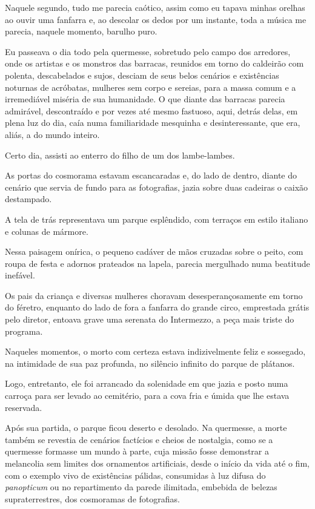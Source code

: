 Naquele segundo, tudo me parecia caótico, assim como eu tapava minhas orelhas ao ouvir uma fanfarra e, ao descolar os dedos por um instante, toda a música me parecia, naquele momento, barulho puro.

Eu passeava o dia todo pela quermesse, sobretudo pelo campo dos arredores, onde os artistas e os monstros das barracas, reunidos em torno do caldeirão com polenta, descabelados e sujos, desciam de seus belos cenários e existências noturnas de acróbatas, mulheres sem corpo e sereias, para a massa comum e a irremediável miséria de sua humanidade. O que diante das barracas parecia admirável, descontraído e por vezes até mesmo fastuoso, aqui, detrás delas, em plena luz do dia, caía numa familiaridade mesquinha e desinteressante, que era, aliás, a do mundo inteiro.

Certo dia, assisti ao enterro do filho de um dos lambe-lambes.

As portas do cosmorama estavam escancaradas e, do lado de dentro, diante do cenário que servia de fundo para as fotografias, jazia sobre duas cadeiras o caixão destampado.

A tela de trás representava um parque esplêndido, com terraços em estilo italiano e colunas de mármore.

Nessa paisagem onírica, o pequeno cadáver de mãos cruzadas sobre o peito, com roupa de festa e adornos prateados na lapela, parecia mergulhado numa beatitude inefável.

Os pais da criança e diversas mulheres choravam desesperançosamente em torno do féretro, enquanto do lado de fora a fanfarra do grande circo, emprestada grátis pelo diretor, entoava grave uma serenata do Intermezzo, a peça mais triste do programa.

Naqueles momentos, o morto com certeza estava indizivelmente feliz e sossegado, na intimidade de sua paz profunda, no silêncio infinito do parque de plátanos.

Logo, entretanto, ele foi arrancado da solenidade em que jazia e posto numa carroça para ser levado ao cemitério, para a cova fria e úmida que lhe estava reservada.

Após sua partida, o parque ficou deserto e desolado. Na quermesse, a morte também se revestia de cenários factícios e cheios de nostalgia, como se a quermesse formasse um mundo à parte, cuja missão fosse demonstrar a melancolia sem limites dos ornamentos artificiais, desde o início da vida até o fim, com o exemplo vivo de existências pálidas, consumidas à luz difusa do \textit{panopticum} ou no repartimento da parede ilimitada, embebida de belezas supraterrestres, dos cosmoramas de fotografias. 

